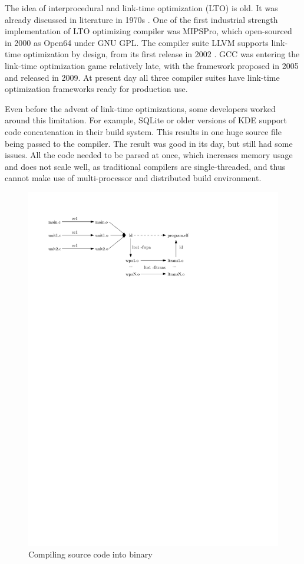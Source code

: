 The idea of interprocedural and link-time optimization (LTO) is old. 
It was already discussed in literature in 1970s \cite{Allen:1974,Allen:1976}.
One of the first industrial strength implementation of LTO optimizing compiler
was MIPSPro, which open-sourced in 2000 as Open64 under GNU GPL. The
compiler suite LLVM supports link-time optimization by design, from its first
release in 2002 \cite{lattner2002llvm}.  GCC was entering the link-time
optimization game relatively late, with the framework proposed in 2005
\cite{gcclto,briggs2007whopr} and released in 2009. At present day all three
compiler suites have link-time optimization frameworks ready for production use.

Even before the advent of link-time optimizations, some developers worked around
this limitation. For example, SQLite or older versions of KDE support code
concatenation in their build system. This results in one huge source file being
passed to the compiler. The result was good in its day, but still had some
issues. All the code needed to be parsed at once, which increases memory usage
and does not scale well, as traditional compilers are single-threaded, and thus
cannot make use of multi-processor and distributed build environment.

\begin{figure}[!ht]
	\centering
	\includegraphics{./img/lto-workflow.pdf}
	\caption{Compiling source code into binary}
	\label{figure-lto-workflow}
\end{figure}

